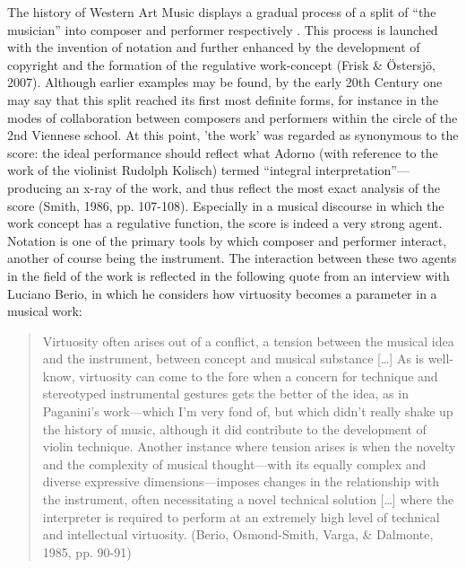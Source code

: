 The history of Western Art Music displays a gradual process of a split
of ``the musician'' into composer and performer respectively
\citep{wis96}. This process is launched with the invention of notation
and further enhanced by the development of copyright and the formation
of the regulative work-concept (Frisk \& \"{O}stersj\"{o},
2007). Although earlier examples may be found, by the early 20th
Century one may say that this split reached its first most definite
forms, for instance in the modes of collaboration between composers
and performers within the circle of the 2nd Viennese school.  At this
point, 'the work' was regarded as synonymous to the score: the ideal
performance should reflect what Adorno (with reference to the work of
the violinist Rudolph Kolisch) termed ``integral
interpretation''---producing an x-ray of the work, and thus reflect
the most exact analysis of the score (Smith, 1986,
pp. 107-108). Especially in a musical discourse in which the work
concept has a regulative function, the score is indeed a very strong
agent. Notation is one of the primary tools by which composer and
performer interact, another of course being the instrument. The
interaction between these two agents in the field of the work is
reflected in the following quote from an interview with Luciano Berio,
in which he considers how virtuosity becomes a parameter in a musical
work:
 
\begin{quote}
  Virtuosity often arises out of a conflict, a tension between the
  musical idea and the instrument, between concept and musical
  substance [\ldots] As is well-know, virtuosity can come to the fore
  when a concern for technique and stereotyped instrumental gestures
  gets the better of the idea, as in Paganini's work---which I'm very
  fond of, but which didn't really shake up the history of music,
  although it did contribute to the development of violin
  technique. Another instance where tension arises is when the novelty
  and the complexity of musical thought---with its equally complex and
  diverse expressive dimensions---imposes changes in the relationship
  with the instrument, often necessitating a novel technical solution
  [\ldots] where the interpreter is required to perform at an extremely
  high level of technical and intellectual virtuosity. (Berio,
  Osmond-Smith, Varga, \& Dalmonte, 1985, pp. 90-91)
\end{quote}

